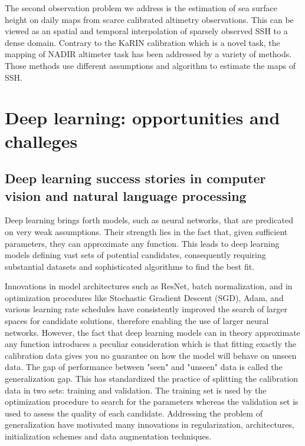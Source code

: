 \begin{bibunit}
The second observation problem we address is the estimation of sea surface height on daily maps from scarce calibrated altimetry observations.
This can be viewed as an spatial and temporal interpolation of sparsely observed SSH to a dense domain.
Contrary to the KaRIN calibration which is a novel task, the mapping of NADIR altimeter task has been addressed by a variety of methods.
Those methods use different assumptions and algorithm to estimate the maps of SSH.


\section{Deep learning: opportunities and challeges}

\subsection{Deep learning success stories in computer vision and natural language processing}
Deep learning brings forth models, such as neural networks, that are predicated on very weak assumptions. Their strength lies in the fact that, given sufficient parameters, they can approximate any function\cite{}. This leads to deep learning models defining vast sets of potential candidates, consequently requiring substantial datasets and sophisticated algorithms to find the best fit.

Innovations in model architectures such as ResNet\cite{}, batch normalization\cite{}, and in optimization procedures\cite{} like Stochastic Gradient Descent (SGD)\cite{}, Adam\cite{}, and various learning rate schedules have consistently improved the search of larger spaces for candidate solutions, therefore enabling the use of larger neural networks. 
However, the fact that deep learning models can in theory approximate any function introduces a peculiar consideration which is that fitting exactly the calibration data gives you no guarantee on how the model will behave on unseen data.
The gap of performance between "seen" and "unseen" data is called the generalization gap.
This has standardized the practice of splitting the calibration data in two sets: training and validation.
The training set is used by the optimization procedure to search for the parameters whereas the validation set is used to assess the quality of each candidate. 
Addressing the problem of generalization have motivated many innovations in regularization, architectures, initialization schemes and data augmentation techniques.



\end{bibunit}
